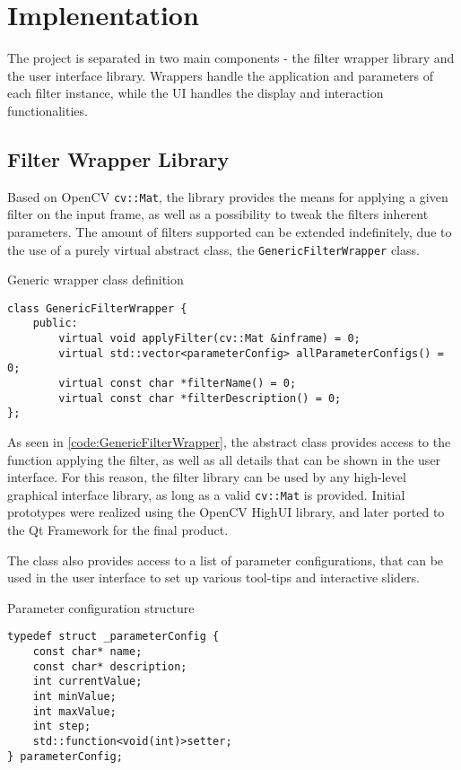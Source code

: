 \chapter{Implenentation}

The project is separated in two main components - the filter wrapper library and the user interface library.
Wrappers handle the application and parameters of each filter instance, while the UI handles the display
and interaction functionalities.

\section{Filter Wrapper Library}

Based on OpenCV \verb|cv::Mat|, the library provides the means for applying a given filter on the input frame,
as well as a possibility to tweak the filters inherent parameters. The amount of filters supported can be
extended indefinitely, due to the use of a purely virtual abstract class, the \verb|GenericFilterWrapper| class.

\begin{code}
	\caption{Generic wrapper class definition}
	\label{code:GenericFilterWrapper}
	\begin{lstlisting}
class GenericFilterWrapper {
    public:
        virtual void applyFilter(cv::Mat &inframe) = 0;
        virtual std::vector<parameterConfig> allParameterConfigs() = 0;
        virtual const char *filterName() = 0;
        virtual const char *filterDescription() = 0;
};
    \end{lstlisting}
\end{code}

As seen in \cref{code:GenericFilterWrapper}, the abstract class provides access to the function
applying the filter, as well as all details that can be shown in the user interface. For this reason,
the filter library can be used by any high-level graphical interface library, as long as a valid
\verb|cv::Mat| is provided. Initial prototypes were realized using the OpenCV HighUI library, and later
ported to the Qt Framework for the final product.

The class also provides access to a list of parameter configurations, that can be used in the user
interface to set up various tool-tips and interactive sliders.

\begin{code}
	\caption{Parameter configuration structure}
	\label{code:parameterConfig}
	\begin{lstlisting}
typedef struct _parameterConfig {
    const char* name;
    const char* description;
    int currentValue;
    int minValue;
    int maxValue;
    int step;
    std::function<void(int)>setter;
} parameterConfig;
    \end{lstlisting}
\end{code}


